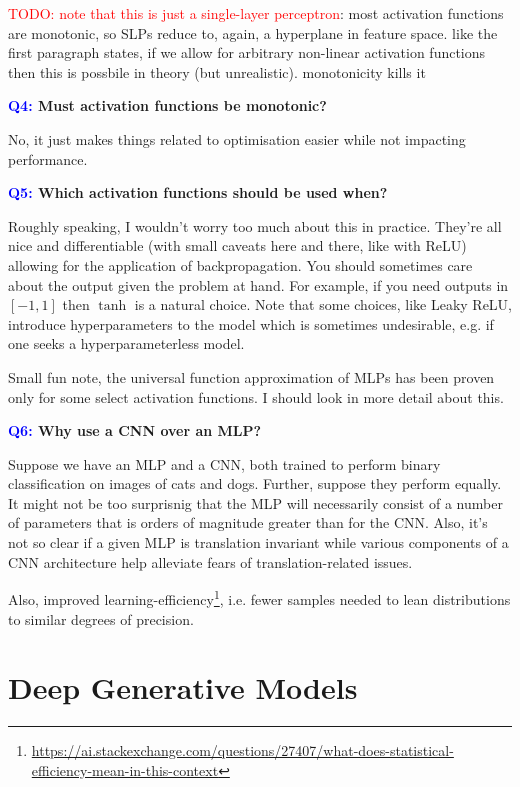 \documentclass[11pt]{article}
\begin{document}
\textcolor{red}{TODO: note that this is just a single-layer perceptron}: most activation functions are monotonic, so SLPs reduce to, again, a hyperplane in feature space. like the first paragraph states, if we allow for arbitrary non-linear activation functions then this is possbile in theory (but unrealistic). monotonicity kills it

\begin{center}
    \textbf{\textcolor{blue}{Q4:} Must activation functions be monotonic?}
\end{center}
No, it just makes things related to optimisation easier while not impacting performance.

\begin{center}
    \textbf{\textcolor{blue}{Q5:} Which activation functions should be used when?}
\end{center}
Roughly speaking, I wouldn't worry too much about this in practice. They're all nice and differentiable (with small caveats here and there, like with ReLU) allowing for the application of backpropagation. You should sometimes care about the output given the problem at hand. For example, if you need outputs in $[-1,1]$ then $\tanh$ is a natural choice. Note that some choices, like Leaky ReLU, introduce hyperparameters to the model which is sometimes undesirable, e.g. if one seeks a hyperparameterless model.

Small fun note, the universal function approximation of MLPs has been proven only for some select activation functions. I should look in more detail about this.

\begin{center}
    \textbf{\textcolor{blue}{Q6:} Why use a CNN over an MLP?}
\end{center}
Suppose we have an MLP and a CNN, both trained to perform binary classification on images of cats and dogs. Further, suppose they perform equally. It might not be too surprisnig that the MLP will necessarily consist of a number of parameters that is orders of magnitude greater than for the CNN. Also, it's not so clear if a given MLP is translation invariant while various components of a CNN architecture help alleviate fears of translation-related issues.

Also, improved learning-efficiency\footnote{\url{https://ai.stackexchange.com/questions/27407/what-does-statistical-efficiency-mean-in-this-context}}, i.e. fewer samples needed to lean distributions to similar degrees of precision.

\section{Deep Generative Models}
\end{document}

